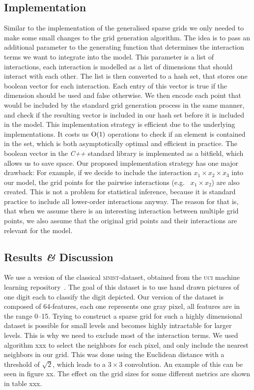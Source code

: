 \subsection{Implementation}
Similar to the implementation of the generalised sparse grids we only needed to
make some small changes to the grid generation algorithm.
The idea is to pass an additional parameter to the generating function that
determines the interaction terms we want to integrate into the model.
This parameter is a list of interactions, each interaction is modelled as a list
of dimensions that should interact with each other.
The list is then converted to a hash set, that stores one boolean vector for
each interaction.
Each entry of this vector is true if the dimension should be used and false
otherwise.
We then encode each point that would be included by the standard grid generation
process in the same manner, and check if the resulting vector is included in our
hash set before it is included in the model.
This implementation strategy is efficient due to the underlying implementations.
It costs us \(\operatorname{O}(1)\) operations to check if an element is contained in the
set, which is both asymptotically optimal and efficient in practice.
The boolean vector in the \emph{C++} standard library is implemented as a bitfield, which allows us to save space.
Our proposed implementation strategy has one major drawback:
For example, if we decide to include the interaction \(x_1 \times x_2 \times
x_3\) into our model, the grid points for the pairwise interactions (e.g.~ \(x_1
\times x_2\)) are also created.
This is not a problem for statistical inference, because it is standard practice
to include all lower-order interactions anyway.
The reason for that is, that when we assume there is an interesting interaction
between multiple grid points, we also assume that the original grid points and
their interactions are relevant for the model.

\subsection{Results \textit{\&} Discussion}
We use a version of the classical \textsc{mnist}-dataset, obtained from the
\textsc{uci} machine learning repository~\cite{datasets-uci}.
The goal of this dataset is to use hand drawn pictures of one digit each to
classify the digit depicted.
Our version of the dataset is composed of 64-features, each one represents one
gray pixel, all features are in the range 0--15.
Trying to construct a sparse grid for such a highly dimensional dataset is
possible for small levels and becomes highly intractable for larger levels.
This is why we need to exclude most of the interaction terms.
We used algorithm xxx to select the neighbors for each pixel, and only include
the nearest neighbors in our grid.
This was done using the Euclidean distance with a threshold of \(\sqrt{2}\),
which leads to a \(3 \times 3\) convolution.
An example of this can be seen in figure xx.
The effect on the grid sizes for some different metrics are shown in table xxx.

